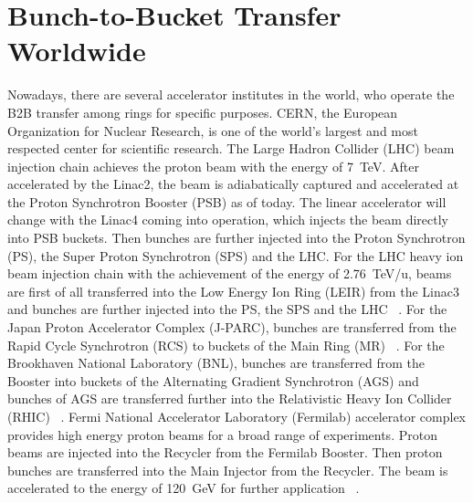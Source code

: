 \section{Bunch-to-Bucket Transfer Worldwide}
Nowadays, there are several accelerator institutes in the world, who operate the B2B transfer among rings for specific purposes. 
	\gls{CERN}, the European Organization for Nuclear Research, is one of the world's largest and most respected center for scientific research. The Large Hadron Collider (\gls{LHC}) beam injection chain achieves the proton beam with the energy of \SI{7}{TeV}. After accelerated by the Linac2, the beam is adiabatically captured and accelerated at the Proton Synchrotron Booster (\gls{PSB}) as of today. The linear accelerator will change with the Linac4 coming into operation, which injects the beam directly into PSB buckets. Then bunches are further injected into the Proton Synchrotron (\gls{PS}), the Super Proton Synchrotron (\gls{SPS}) and the LHC. For the LHC heavy ion beam injection chain with the achievement of the energy of \SI{2.76}{TeV/u}, beams are first of all transferred into the Low Energy Ion Ring (\gls{LEIR}) from the Linac3 and bunches are further injected into the PS, the SPS and the LHC ~\cite{noauthor_cern_nodate}. For the Japan Proton Accelerator Complex (\gls{J-PARC}), bunches are transferred from the Rapid Cycle Synchrotron (\gls{RCS}) to buckets of the Main Ring (\gls{MR}) ~\cite{noauthor_j-parc_2016}. For the Brookhaven National Laboratory (\gls{BNL}), bunches are transferred from the Booster into buckets of the Alternating Gradient Synchrotron (\gls{AGS}) and bunches of AGS are transferred further into the Relativistic Heavy Ion Collider (\gls{RHIC}) ~\cite{noauthor_brookhaven_2017}. Fermi National Accelerator Laboratory (\gls{Fermilab}) accelerator complex provides high energy proton beams for a broad range of experiments. Proton beams are injected into the Recycler from the \gls{Fermilab} Booster. Then proton bunches are transferred into the Main Injector from the Recycler. The beam is accelerated to the energy of \SI{120}{GeV} for further application ~\cite{noauthor_fermi_2016}. 

